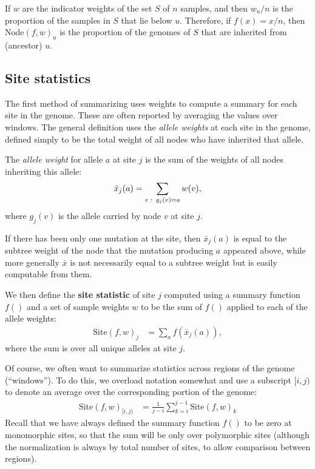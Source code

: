 \documentclass{article}
\newcommand{\site}{\mbox{Site}} %
\newcommand{\node}{\mbox{Node}} %
\newcommand{\iw}{w} %
\newcommand{\aw}{{\bar x}} %
\begin{document}
\begin{example} \label{ex:ancestry_props}
    If $\iw$ are the indicator weights of the set $S$ of $n$ samples,
    and then $\iw_u / n$ is the proportion of the samples in $S$ that lie below $u$.
    Therefore, if $f(x) = x / n$,
    then $\node(f, \iw)_u$ is the proportion of the genomes of $S$
    that are inherited from (ancestor) $u$.
\end{example}


\subsection*{Site statistics}

The first method of summarizing uses weights
to compute a summary for each site in the genome.
These are often reported by averaging the values over windows.
The general definition uses the \emph{allele weights} at each site in the genome,
defined simply to be the total weight of all nodes who have inherited that allele.

\begin{definition}
    The \emph{allele weight} for allele $a$ at site $j$ is the sum of the weights
    of all nodes inheriting this allele:
    \begin{align*}
        \aw_j(a) = \sum_{v \st g_j(v) = a} \iw(v) ,
    \end{align*}
    where $g_j(v)$ is the allele carried by node $v$ at site $j$.
\end{definition}

If there has been only one mutation at the site,
then $\aw_j(a)$ is equal to the subtree weight of the node that the mutation producing $a$
appeared above, 
while more generally $\aw$ is not necessarily equal to a subtree weight 
but is easily computable from them.

We then define the \textbf{site statistic} of site $j$ computed using a summary function $f()$
and a set of sample weights $\iw$
to be the sum of $f()$ applied to each of the allele weights:
\begin{align}
    \site(f, \iw)_j
    &=
    \sum_{a} f(\aw_j(a)) ,
\end{align}
where the sum is over all unique alleles at site $j$.

Of course, we often want to summarize statistics across regions of the genome (``windows'').
To do this, we overload notation somewhat and use a subscript $[i,j)$ to denote an average
over the corresponding portion of the genome:
\begin{align}
    \site(f, \iw)_{[i,j)}
    &=
    \frac{1}{j-i} \sum_{k=i}^{j-1} \site(f, \iw)_k
\end{align}
Recall that we have always defined the summary function $f()$ to be zero at monomorphic sites,
so that the sum will be only over polymorphic sites
(although the normalization is always by total number of sites, to allow comparison between regions).
\end{document}
